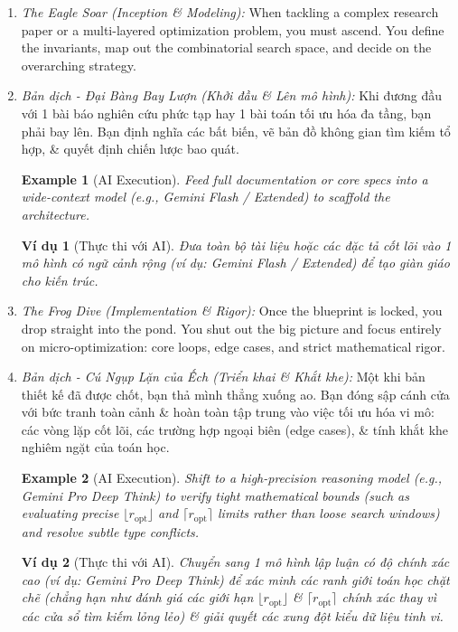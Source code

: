 \documentclass{article}
\newtheorem{example}{Example}
\newtheorem{vidu}{Ví dụ}
\begin{document}
\begin{enumerate}[label=\emph{\arabic*.}]
	\item \emph{The Eagle Soar (Inception \& Modeling):} When tackling a complex research paper or a multi-layered optimization problem, you must ascend. You define the invariants, map out the combinatorial search space, and decide on the overarching strategy.
	
	\item \emph{Bản dịch - Đại Bàng Bay Lượn (Khởi đầu \& Lên mô hình):} Khi đương đầu với 1 bài báo nghiên cứu phức tạp hay 1 bài toán tối ưu hóa đa tầng, bạn phải bay lên. Bạn định nghĩa các bất biến, vẽ bản đồ không gian tìm kiếm tổ hợp, \& quyết định chiến lược bao quát.
	
	\begin{example}[AI Execution]
		Feed full documentation or core specs into a wide-context model (e.g., Gemini Flash / Extended) to scaffold the architecture.
	\end{example}
	\begin{vidu}[Thực thi với AI]
		Đưa toàn bộ tài liệu hoặc các đặc tả cốt lõi vào 1 mô hình có ngữ cảnh rộng (ví dụ: Gemini Flash / Extended) để tạo giàn giáo cho kiến trúc.
	\end{vidu}
	
	\item \emph{The Frog Dive (Implementation \& Rigor):} Once the blueprint is locked, you drop straight into the pond. You shut out the big picture and focus entirely on micro-optimization: core loops, edge cases, and strict mathematical rigor.
	
	\item \emph{Bản dịch - Cú Ngụp Lặn của Ếch (Triển khai \& Khắt khe):} Một khi bản thiết kế đã được chốt, bạn thả mình thẳng xuống ao. Bạn đóng sập cánh cửa với bức tranh toàn cảnh \& hoàn toàn tập trung vào việc tối ưu hóa vi mô: các vòng lặp cốt lõi, các trường hợp ngoại biên (edge cases), \& tính khắt khe nghiêm ngặt của toán học.
	
	\begin{example}[AI Execution]
		Shift to a high-precision reasoning model (e.g., Gemini Pro Deep Think) to verify tight mathematical bounds (such as evaluating precise $\lfloor r_{\text{opt}} \rfloor$ and $\lceil r_{\text{opt}} \rceil$ limits rather than loose search windows) and resolve subtle type conflicts.
	\end{example}
	\begin{vidu}[Thực thi với AI]
		Chuyển sang 1 mô hình lập luận có độ chính xác cao (ví dụ: Gemini Pro Deep Think) để xác minh các ranh giới toán học chặt chẽ (chẳng hạn như đánh giá các giới hạn $\lfloor r_{\text{opt}} \rfloor$ \& $\lceil r_{\text{opt}} \rceil$ chính xác thay vì các cửa sổ tìm kiếm lỏng lẻo) \& giải quyết các xung đột kiểu dữ liệu tinh vi.
	\end{vidu}
	

\end{enumerate}
\end{document}

